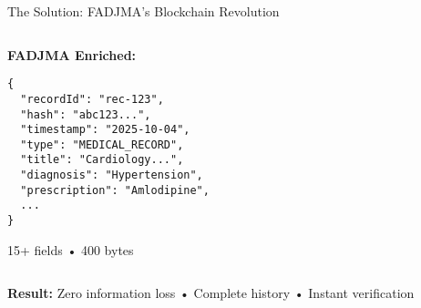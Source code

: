 \documentclass[aspectratio=169,xcolor=dvipsnames,14pt]{beamer}
\begin{document}
\begin{frame}[fragile,shrink=5]{The Solution: FADJMA's Blockchain Revolution}
\begin{columns}[T]
\begin{column}{0.5\textwidth}
      \textbf{FADJMA Enriched:}
      \begin{verbatim}
{
  "recordId": "rec-123",
  "hash": "abc123...",
  "timestamp": "2025-10-04",
  "type": "MEDICAL_RECORD",
  "title": "Cardiology...",
  "diagnosis": "Hypertension",
  "prescription": "Amlodipine",
  ...
}
      \end{verbatim}
      \textcolor{SuccessGreen}{15+ fields • 400 bytes}
    \end{column}
  \end{columns}

  \vspace{0.2cm}

  \begin{center}
    \small
    \textbf{Result:} \textcolor{SuccessGreen}{Zero information loss} • Complete history • Instant verification
  \end{center}

\end{frame}
\end{document}
